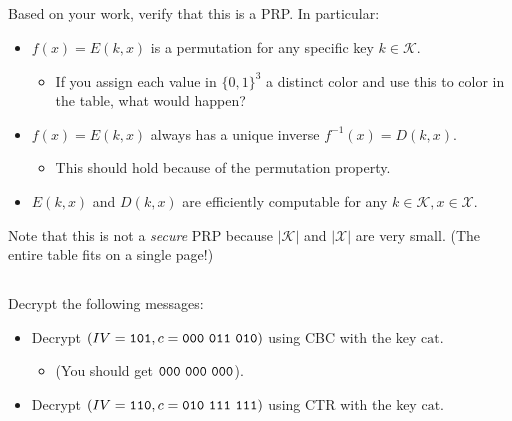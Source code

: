 \documentclass[12pt]{article}
\begin{document}
\newpage
\subsection{}

Based on your work, verify that this is a PRP. In particular:

\begin{itemize}
\item $f(x) = E(k, x)$ is a permutation for any specific key $k \in \mathcal{K}$.
\begin{itemize}
\item If you assign each value in $\{0, 1\}^3$ a distinct color and use this to color in the table, what would happen?
\end{itemize}
\item $f(x) = E(k, x)$ always has a unique inverse $f^{-1}(x) = D(k, x)$.
\begin{itemize}
\item This should hold because of the permutation property.
\end{itemize}
\item $E(k, x)$ and $D(k, x)$ are efficiently computable for any $k \in \mathcal{K}, x \in \mathcal{X}$.
\end{itemize}

Note that this is not a \emph{secure} PRP because $|\mathcal{K}|$ and $|\mathcal{X}|$ are very small. (The entire table fits on a single page!)

\subsection{}

Decrypt the following messages:

\begin{itemize}
\item Decrypt $(IV = {\tt 101}, c = {\tt 000~011~010 })$ using CBC with the key $\text{cat}$.
\begin{itemize}
\item (You should get ${\tt 000~000~000}$).
\end{itemize}
\item Decrypt $(IV = {\tt 110}, c = {\tt 010~111~111})$ using CTR with the key $\text{cat}$.  
\end{itemize}

\section{}
\end{document}

